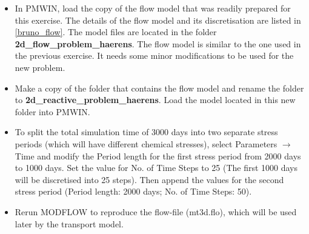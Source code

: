 \begin{itemize}

\item In PMWIN, load the copy of the flow model that was readily prepared 
for this exercise. The details of the flow model 
and its discretisation are listed in \ref{bruno_flow}.
The model files are located in the folder {\color{red} \textbf{2d\_flow\_problem\_haerens}}.
The flow model is similar to the one used in the previous exercise.
It needs some minor modifications to be used for the new problem.

\item Make a copy of the folder that contains the flow model and rename the
folder to {\color{red} \textbf{2d\_reactive\_problem\_haerens}}. Load the model located in this
new folder into PMWIN.

\item To split the total simulation time of 3000 days
into two separate stress periods (which will have different chemical stresses), 
select Parameters $\rightarrow$ Time and modify the Period length 
for the first stress period from 2000 days to 1000 days.
Set the value for No. of Time Steps to 25 (The first 1000 days will be 
discretised into 25 steps). Then append the values for the second stress period
(Period length: 2000 days; No. of Time Steps: 50). 

\item Rerun MODFLOW to reproduce the flow-file (mt3d.flo), which will be used later by the transport model.

\end{itemize}

